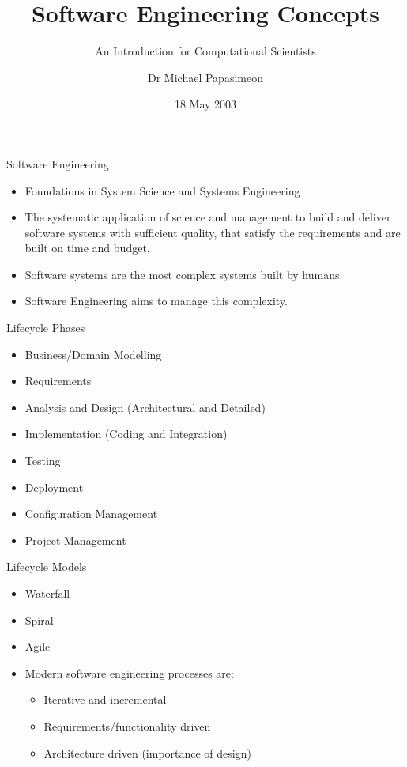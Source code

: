\documentclass[aspectratio=1610,xcolor=dvipsnames,t,compress]{beamer}
\title[Software Engineering]{Software Engineering Concepts}
\subtitle{An Introduction for Computational Scientists}
\author[Michael Papasimeon]{Dr Michael Papasimeon}
\date{18 May 2003}
\begin{document}
\begin{frame}
    \maketitle
\end{frame} 

\begin{frame}{Software Engineering}
    \begin{itemize}
        \item Foundations in System Science and Systems Engineering
        \item The systematic application of science and management to 
              build and deliver software systems with sufficient 
              quality, that satisfy the requirements and are 
              built on time and budget.
        \item Software systems are the most complex systems built by humans. 
        \item Software Engineering aims to manage this complexity.
    \end{itemize}
\end{frame}

\begin{frame}{Lifecycle Phases}
    \begin{itemize}
        \item Business/Domain Modelling 
        \item Requirements
        \item Analysis and Design (Architectural and Detailed)
        \item Implementation (Coding and Integration)
        \item Testing
        \item Deployment
        \item Configuration Management
        \item Project Management
    \end{itemize}
\end{frame}

\begin{frame}{Lifecycle Models}
    \begin{itemize}
        \item Waterfall
        \item Spiral
        \item Agile
        \item Modern software engineering processes are:
            \begin{itemize}
                \item Iterative and incremental
                \item Requirements/functionality driven
                \item Architecture driven (importance of design)
            \end{itemize}
    \end{itemize}
\end{frame} 
\end{document}
